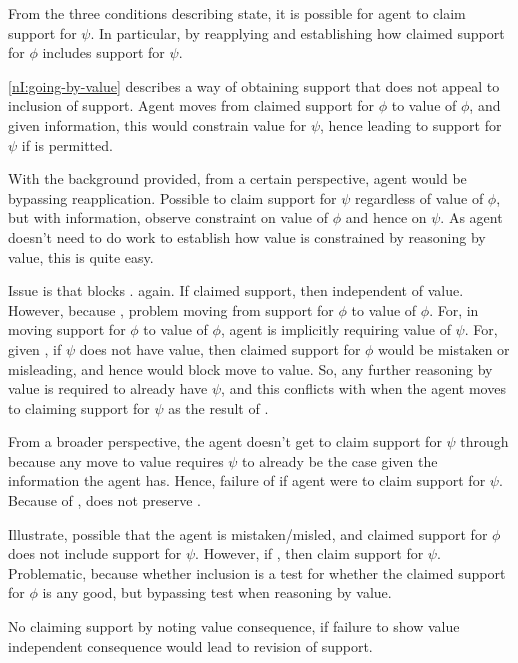 \begin{note}
  From the three conditions describing state, it is possible for agent to claim support for \(\psi\).
  In particular, by reapplying and establishing how claimed support for \(\phi\) includes support for \(\psi\).

  \ref{nI:going-by-value} describes a way of obtaining support that does not appeal to inclusion of support.
  Agent moves from claimed support for \(\phi\) to value of \(\phi\), and given information, this would constrain value for \(\psi\), hence leading to support for \(\psi\) if \RBV{} is permitted.

  With the background provided, from a certain perspective, agent would be bypassing reapplication.
  Possible to claim support for \(\psi\) regardless of value of \(\phi\), but with information, observe constraint on value of \(\phi\) and hence on \(\psi\).
  As agent doesn't need to do work to establish how value is constrained by reasoning by value, this is quite easy.

  Issue is that \incl{} blocks \RBV{}.
  \eiS{} again.
  If claimed support, then independent of value.
  However, because \incl{}, problem moving from support for \(\phi\) to value of \(\phi\).
  For, in moving support for \(\phi\) to value of \(\phi\), agent is implicitly requiring value of \(\psi\).
  For, given \incl{}, if \(\psi\) does not have value, then claimed support for \(\phi\) would be mistaken or misleading, and hence would block move to value.
  So, any further reasoning by value is required to already have \(\psi\), and this conflicts with \eiS{} when the agent moves to claiming support for \(\psi\) as the result of \RBV{}.

  From a broader perspective, the agent doesn't get to claim support for \(\psi\) through \RBV{} because any move to value requires \(\psi\) to already be the case given the information the agent has.
  Hence, failure of \eiS{} if agent were to claim support for \(\psi\).
  Because of \incl{}, \RBV{} does not preserve \eiS{}.

  Illustrate, possible that the agent is mistaken/misled, and claimed support for \(\phi\) does not include support for \(\psi\).
  However, if \RBV{}, then claim support for \(\psi\).
  Problematic, because whether inclusion is a test for whether the claimed support for \(\phi\) is any good, but bypassing test when reasoning by value.

  No claiming support by noting value consequence, if failure to show value independent consequence would lead to revision of support.
\end{note}

